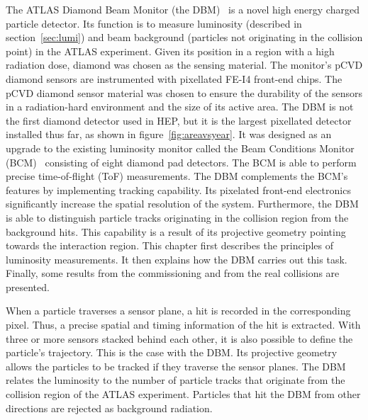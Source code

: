 The ATLAS Diamond Beam Monitor (the DBM)~\cite{Cerv:1630832} is a novel high energy charged particle detector. Its function is to measure luminosity (described in section~\ref{sec:lumi}) and beam background (particles not originating in the collision point) in the ATLAS experiment. Given its position in a region with a high radiation dose, diamond was chosen as the sensing material. The monitor's pCVD diamond sensors are instrumented with pixellated FE-I4 front-end chips. The pCVD diamond sensor material was chosen to ensure the durability of the sensors in a radiation-hard environment and the size of its active area. The DBM is not the first diamond detector used in HEP, but it is the largest pixellated detector installed thus far, as shown in figure~\ref{fig:areavsyear}. It was designed as an upgrade to the existing luminosity monitor called the Beam Conditions Monitor (BCM)~\cite{Gorisek:1062633} consisting of eight diamond pad detectors. The BCM is able to perform precise time-of-flight (ToF) measurements. The DBM complements the BCM's features by implementing tracking capability. Its pixelated front-end electronics significantly increase the spatial resolution of the system. Furthermore, the DBM is able to distinguish particle tracks originating in the collision region from the background hits. This capability is a result of its projective geometry pointing towards the interaction region. This chapter first describes the principles of luminosity measurements. It then explains how the DBM carries out this task. Finally, some results from the commissioning and from the real collisions are presented. 

When a particle traverses a sensor plane, a hit is recorded in the corresponding pixel. Thus, a precise spatial and timing information of the hit is extracted. With three or more sensors stacked behind each other, it is also possible to define the particle's trajectory. This is the case with the DBM. Its projective geometry allows the particles to be tracked if they traverse the sensor planes. The DBM relates the luminosity to the number of particle tracks that originate from the collision region of the ATLAS experiment. Particles that hit the DBM from other directions are rejected as background radiation.

